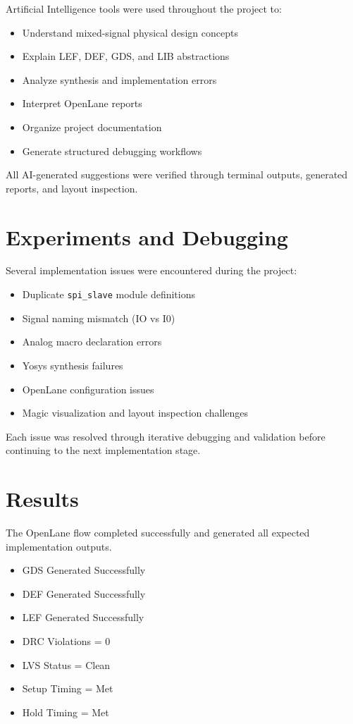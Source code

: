 \documentclass[conference]{IEEEtran}
\begin{document}
Artificial Intelligence tools were used throughout the project to:

\begin{itemize}
\item Understand mixed-signal physical design concepts
\item Explain LEF, DEF, GDS, and LIB abstractions
\item Analyze synthesis and implementation errors
\item Interpret OpenLane reports
\item Organize project documentation
\item Generate structured debugging workflows
\end{itemize}

All AI-generated suggestions were verified through terminal outputs, generated reports, and layout inspection.

\section{Experiments and Debugging}

Several implementation issues were encountered during the project:

\begin{itemize}
\item Duplicate \texttt{spi_slave} module definitions
\item Signal naming mismatch (IO vs I0)
\item Analog macro declaration errors
\item Yosys synthesis failures
\item OpenLane configuration issues
\item Magic visualization and layout inspection challenges
\end{itemize}

Each issue was resolved through iterative debugging and validation before continuing to the next implementation stage.

\section{Results}

The OpenLane flow completed successfully and generated all expected implementation outputs.

\begin{itemize}
\item GDS Generated Successfully
\item DEF Generated Successfully
\item LEF Generated Successfully
\item DRC Violations = 0
\item LVS Status = Clean
\item Setup Timing = Met
\item Hold Timing = Met
\end{itemize}
\end{document}
